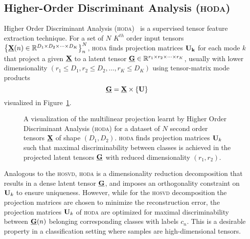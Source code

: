 \documentclass[twocolumn]{article}
\begin{document}
\subsection{Higher-Order Discriminant Analysis (\textsc{hoda})}
Higher Order Discriminant Analysis (\textsc{hoda})~\cite{Phan2010} is a
supervised tensor
feature extraction technique. For a set of $N$ $K^{th}$ order input tensors
$\left\{\underline{\mathbf{X}}(n)\in\mathbb{R}^{D_1\times D_2 \times \cdots \times
D_K}\right\}_n^N$, \textsc{hoda} finds projection matrices $\mathbf{U_k}$ for each mode $k$
that project a given $\underline{\mathbf{X}}$ to a latent tensor
$\underline{\mathbf{G}}\in\mathbb{R}^{r_1\times r_2\times\cdots\times r_K}$, usually with lower
dimensionality $(r_1\leq D_1,r_2\leq D_2,\ldots,r_K\leq D_K)$ using
tensor-matrix mode products
\begin{equation}
	\underline{\mathbf{G}}  = \underline{\mathbf{X}}\times\left\{\mathbf{U}\right\}
	\label{eq:hoda-backward}
\end{equation}
visualized in Figure~\ref{fig:hoda-backward}.
\begin{figure}
	\centering
	
	\caption{A visualization of the multilinear projection learnt by Higher Order
		Discriminant Analysis (\textsc{hoda}) for a dataset of $N$ second order tensors
		$\underline{\mathbf{X}}$ of shape $(D_1,D_2)$.
		\textsc{hoda} finds projection matrices $\mathbf{U}_k$ such that maximal
		discriminability between classes is achieved in the projected latent tensors
		$\underline{\mathbf{G}}$ with reduced dimensionality $(r_1,r_2)$.}
	\label{fig:hoda-backward}
\end{figure}
Analogous to the \textsc{hosvd}, \textsc{hoda} is a dimensionality
reduction decomposition that results in a dense latent tensor $\underline{\mathbf{G}}$, and
imposes an orthogonality constraint on $\mathbf{U}_k$ to ensure uniqueness.
However, while for the \textsc{hosvd} decomposition the projection matrices
are chosen to minimize the reconstruction error, the projection matrices
$\mathbf{U}_k$ of \textsc{hoda} are optimized for maximal discriminability between
$\underline{\mathbf{G}}(n)$ belonging corresponding classes with labels $c_n$.
This is a desirable property in a classification setting where samples are
high-dimensional tensors.
\end{document}
